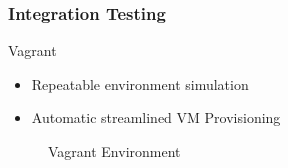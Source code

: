 \begin{frame}
\frametitle{Integration Testing}

\begin{block}{Vagrant}

\begin{itemize}
\item Repeatable environment simulation
\item Automatic streamlined VM Provisioning
\end{itemize}

\end{block}

\begin{figure}
\caption*{Vagrant Environment}
\end{figure}

\end{frame}
